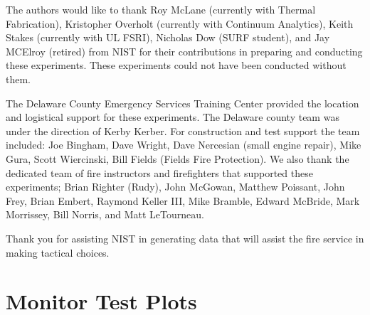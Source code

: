 \documentclass[12pt,oneside]{book}
\begin{document}
The authors would like to thank Roy McLane (currently with Thermal Fabrication), Kristopher Overholt (currently with Continuum Analytics), Keith Stakes (currently with UL FSRI), Nicholas Dow (SURF student), and Jay MCElroy (retired) from NIST for their contributions in preparing and conducting these experiments. These experiments could not have been conducted without them. 

The Delaware County Emergency Services Training Center provided the location and logistical support for these experiments.  The Delaware county team was under the direction of Kerby Kerber.  For construction and test support the team included: Joe Bingham, Dave Wright, Dave Nercesian (small engine repair), Mike Gura, Scott Wiercinski, Bill Fields (Fields Fire Protection).  We also thank the dedicated team of fire instructors and firefighters that supported these experiments; Brian Righter (Rudy), John McGowan, Matthew Poissant, John Frey, Brian Embert, Raymond Keller III, Mike Bramble, Edward McBride, Mark Morrissey, Bill Norris, and Matt LeTourneau.

Thank you for assisting NIST in generating data that will assist the fire service in making tactical choices.





\appendix
\chapter{Monitor Test Plots}
\label{chap:monitor_plots}
\end{document}
